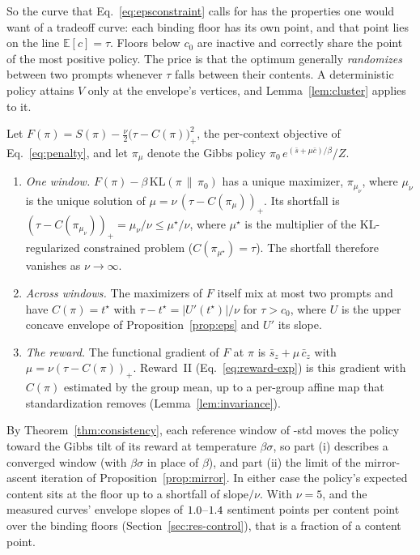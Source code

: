 So the curve that Eq.~\eqref{eq:epsconstraint} calls for has the properties one
would want of a tradeoff curve: each binding floor has its own point, and that
point lies on the line $\mathbb{E}[c] = \tau$. Floors below $c_0$ are inactive and
correctly share the point of the most positive policy. The price is that the
optimum generally \emph{randomizes} between two prompts whenever $\tau$ falls
between their contents. A deterministic policy attains $V$ only at the
envelope's vertices, and Lemma~\ref{lem:cluster} applies to it.

\begin{proposition}
\label{prop:penalty}
Let $F(\pi) = S(\pi) - \frac{\nu}{2}\bigl(\tau - C(\pi)\bigr)_+^2$, the
per-context objective of Eq.~\eqref{eq:penalty}, and let $\pi_\mu$ denote the
Gibbs policy $\pi_0\,e^{(\bar s + \mu \bar c)/\beta}/Z$.
\begin{enumerate}[label=(\roman*),itemsep=1pt,topsep=2pt]
  \item \emph{One window.} $F(\pi) - \beta\,\mathrm{KL}(\pi\,\|\,\pi_0)$ has a
        unique maximizer, $\pi_{\mu_\nu}$, where $\mu_\nu$ is the unique solution
        of $\mu = \nu\,(\tau - C(\pi_\mu))_+$. Its shortfall is
        $(\tau - C(\pi_{\mu_\nu}))_+ = \mu_\nu/\nu \le \mu^\star/\nu$, where
        $\mu^\star$ is the multiplier of the KL-regularized constrained problem
        ($C(\pi_{\mu^\star}) = \tau$). The shortfall therefore vanishes as
        $\nu \to \infty$.
  \item \emph{Across windows.} The maximizers of $F$ itself mix at most two
        prompts and have $C(\pi) = t^\star$ with
        $\tau - t^\star = |U'(t^\star)|/\nu$ for $\tau > c_0$, where $U$ is the
        upper concave envelope of Proposition~\ref{prop:eps} and $U'$ its slope.
  \item \emph{The reward.} The functional gradient of $F$ at $\pi$ is
        $\bar s_z + \mu\,\bar c_z$ with $\mu = \nu(\tau - C(\pi))_+$. Reward~II
        (Eq.~\ref{eq:reward-exp}) is this gradient with $C(\pi)$ estimated by the
        group mean, up to a per-group affine map that standardization removes
        (Lemma~\ref{lem:invariance}).
\end{enumerate}
\end{proposition}

By Theorem~\ref{thm:consistency}, each reference window of \rrebel{}-std moves
the policy toward the Gibbs tilt of its reward at temperature $\beta\sigma$, so
part (i) describes a converged window (with $\beta\sigma$ in place of $\beta$),
and part (ii) the limit of the mirror-ascent iteration of
Proposition~\ref{prop:mirror}. In either case the policy's expected content
sits at the floor up to a shortfall of slope$/\nu$. With $\nu = 5$, and the
measured curves' envelope slopes of $1.0$--$1.4$ sentiment points
per content point over the binding floors (Section~\ref{sec:res-control}), that
is a fraction of a content point.

